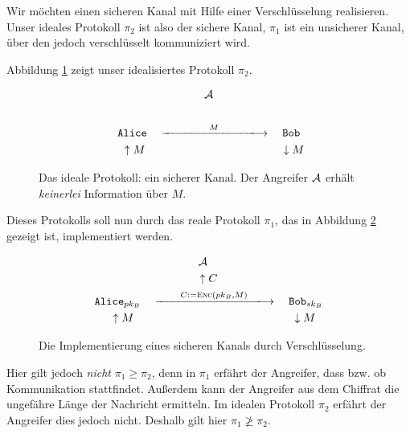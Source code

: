 \begin{beispiel}
	Wir möchten einen sicheren Kanal mit Hilfe einer Verschlüsselung realisieren. Unser ideales Protokoll $\pi_2$ ist also der sichere Kanal, $\pi_1$ ist ein unsicherer Kanal, über den jedoch verschlüsselt kommuniziert wird.
	
	Abbildung \ref{fig:protocols:reallysecurechannel} zeigt unser idealisiertes Protokoll $\pi_2$.
	\begin{figure}[hbtp]
		\begin{center}
			\begin{gather*}
				\advA\\
				\\
				\texttt{Alice} \quad \xlongrightarrow{\qquad\qquad M\qquad\qquad}
				\quad \texttt{Bob}\\
				\quad\uparrow M\qquad\qquad\qquad\qquad\qquad\qquad\downarrow M
		    \end{gather*}
		\end{center}
		\caption{Das ideale Protokoll: ein sicherer Kanal. Der Angreifer $\mathcal{A}$ erhält \emph{keinerlei} Information über $M$.}
		\label{fig:protocols:reallysecurechannel}
	\end{figure}
	Dieses Protokolls soll nun durch das reale Protokoll $\pi_1$, das in Abbildung \ref{fig:protocols:insecurechannelwithencryption} gezeigt ist, implementiert werden.
	
	\begin{figure}[hbtp]
		\begin{center}
			\begin{gather*}
				\advA\quad\\
				\uparrow C\\
				\texttt{Alice}_{\pkey_B}\quad
				\xlongrightarrow{\qquad C:=\enc(\pkey_B,M)\qquad}
				\quad\texttt{Bob}_{\skey_B}\\
				\quad\uparrow M\qquad\qquad\qquad\qquad\qquad\qquad\qquad\downarrow M
			\end{gather*}
		\end{center}
		\caption{Die Implementierung eines sicheren Kanals durch Verschlüsselung.}
		\label{fig:protocols:insecurechannelwithencryption}
	\end{figure}
	
	Hier gilt jedoch \emph{nicht} $\pi_1 \geq \pi_2$, denn in $\pi_1$ erfährt der Angreifer, dass bzw. ob Kommunikation stattfindet. Außerdem kann der Angreifer aus dem Chiffrat die ungefähre Länge der Nachricht ermitteln. Im idealen Protokoll $\pi_2$ erfährt der Angreifer dies jedoch nicht. Deshalb gilt hier $\pi_1 \not\geq \pi_2$.
\end{beispiel}

